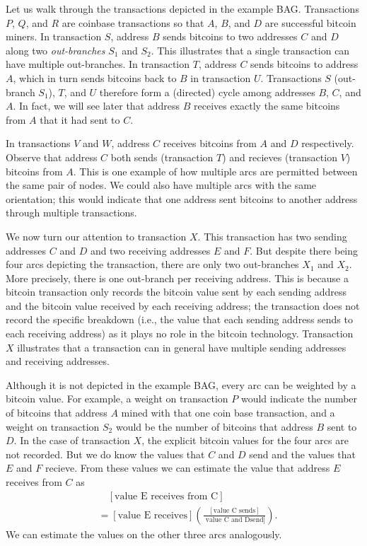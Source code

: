 \documentclass[letterpaper, 10 pt, conference]{ieeeconf}  %
\begin{document}
Let us walk through the transactions depicted in the example BAG. Transactions $P$, $Q$, and $R$ are coinbase transactions so that $A$, $B$, and $D$ are successful bitcoin miners. In transaction $S$, address $B$ sends bitcoins to two addresses $C$ and $D$ along two \emph{out-branches} $S_1$ and $S_2$. This illustrates that a single transaction can have multiple out-branches. In transaction $T$, address $C$ sends bitcoins to address $A$, which in turn sends bitcoins back to $B$ in transaction $U$. Transactions $S$ (out-branch $S_1$), $T$, and $U$ therefore form a (directed) cycle among addresses $B$, $C$, and $A$. In fact, we will see later that address $B$ receives exactly the same bitcoins from $A$ that it had sent to $C$.

In transactions $V$ and $W$, address $C$ receives bitcoins from $A$ and $D$ respectively. Observe that address $C$ both sends (transaction $T$) and recieves (transaction $V$) bitcoins from $A$. This is one example of how multiple arcs are permitted between the same pair of nodes. We could also have multiple arcs with the same orientation; this would indicate that one address sent bitcoins to another address through multiple transactions.

We now turn our attention to transaction $X$. This transaction has two sending addresses $C$ and $D$ and two receiving addresses $E$ and $F$. But despite there being four arcs depicting the transaction, there are only two out-branches $X_1$ and $X_2$. More precisely, there is one out-branch per receiving address. This is because a bitcoin transaction only records the bitcoin value sent by each sending address and the bitcoin value received by each receiving address; the transaction does not record the specific breakdown (i.e., the value that each sending address sends to each receiving address) as it plays no role in the bitcoin technology. Transaction $X$ illustrates that a transaction can in general have multiple sending addresses and receiving addresses.

Although it is not depicted in the example BAG, every arc can be weighted by a bitcoin value. For example, a weight on transaction $P$ would indicate the number of bitcoins that address $A$ mined with that one coin base transaction, and a weight on transaction $S_2$ would be the number of bitcoins that address $B$ sent to $D$. In the case of transaction $X$, the explicit bitcoin values for the four arcs are not recorded. But we do know the values that $C$ and $D$ send and the values that $E$ and $F$ recieve. From these values we can estimate the value that address $E$ receives from $C$ as
\begin{align*}
&\quad [\mbox{value E receives from C}] \\
&= [\mbox{value E receives}]\left(\frac{[\mbox{value C sends}]}{\mbox{ value C and Dsend}]}\right).
\end{align*}
We can estimate the values on the other three arcs analogously.
\end{document}

